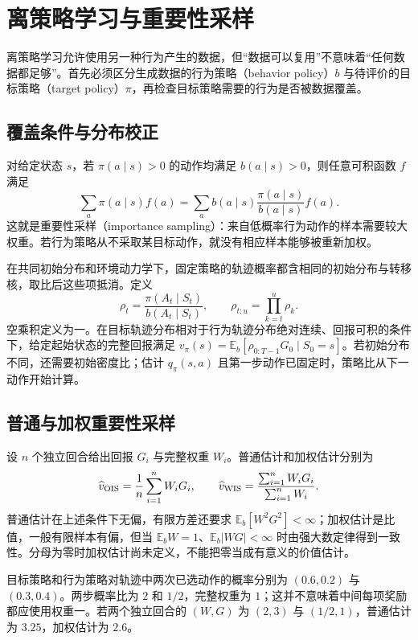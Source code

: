 \documentclass[UTF8,12pt,a4paper,fontset=fandol]{ctexbook}
\begin{document}
\chapter{离策略学习与重要性采样}
\label{ch:rl-offpolicy}

离策略学习允许使用另一种行为产生的数据，但“数据可以复用”不意味着“任何数据都足够”。首先必须区分生成数据的行为策略（behavior policy）$b$ 与待评价的目标策略（target policy）$\pi$，再检查目标策略需要的行为是否被数据覆盖。

\section{覆盖条件与分布校正}

对给定状态 $s$，若 $\pi(a\mid s)>0$ 的动作均满足 $b(a\mid s)>0$，则任意可积函数 $f$ 满足
\[
\sum_a\pi(a\mid s)f(a)=\sum_a b(a\mid s)\frac{\pi(a\mid s)}{b(a\mid s)}f(a).
\]
这就是重要性采样（importance sampling）：来自低概率行为动作的样本需要较大权重。若行为策略从不采取某目标动作，就没有相应样本能够被重新加权。

在共同初始分布和环境动力学下，固定策略的轨迹概率都含相同的初始分布与转移核，取比后这些项抵消。定义
\[
\rho_t=\frac{\pi(A_t\mid S_t)}{b(A_t\mid S_t)},\qquad
\rho_{t:u}=\prod_{k=t}^{u}\rho_k.
\]
空乘积定义为一。在目标轨迹分布相对于行为轨迹分布绝对连续、回报可积的条件下，给定起始状态的完整回报满足 $v_\pi(s)=\mathbb E_b[\rho_{0:T-1}G_0\mid S_0=s]$。若初始分布不同，还需要初始密度比；估计 $q_\pi(s,a)$ 且第一步动作已固定时，策略比从下一动作开始计算。

\section{普通与加权重要性采样}

设 $n$ 个独立回合给出回报 $G_i$ 与完整权重 $W_i$。普通估计和加权估计分别为
\[
\widehat v_{\rm OIS}=\frac1n\sum_{i=1}^nW_iG_i,\qquad
\widehat v_{\rm WIS}=\frac{\sum_{i=1}^nW_iG_i}{\sum_{i=1}^nW_i}.
\]
普通估计在上述条件下无偏，有限方差还要求 $\mathbb E_b[W^2G^2]<\infty$；加权估计是比值，一般有限样本有偏，但当 $\mathbb E_bW=1$、$\mathbb E_b|WG|<\infty$ 时由强大数定律得到一致性。分母为零时加权估计尚未定义，不能把零当成有意义的价值估计。

\begin{example}[概率比的乘积]
目标策略和行为策略对轨迹中两次已选动作的概率分别为 $(0.6,0.2)$ 与 $(0.3,0.4)$。两步概率比为 $2$ 和 $1/2$，完整权重为 $1$；这并不意味着中间每项奖励都应使用权重一。若两个独立回合的 $(W,G)$ 为 $(2,3)$ 与 $(1/2,1)$，普通估计为 $3.25$，加权估计为 $2.6$。
\end{example}
\end{document}
